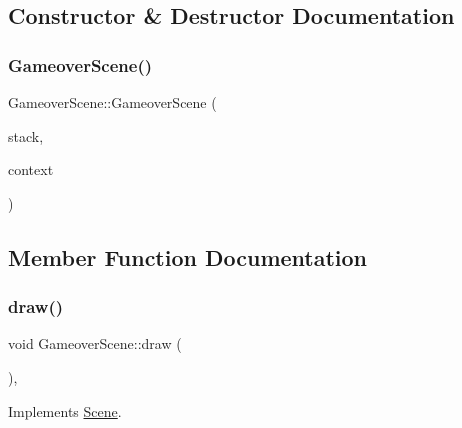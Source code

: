 \subsection{Constructor \& Destructor Documentation}
\mbox{\label{class_gameover_scene_a8d57771f3b59da589d2341d4d3b9d299}} 
\subsubsection{\texorpdfstring{Gameover\+Scene()}{GameoverScene()}}
{\footnotesize\ttfamily Gameover\+Scene\+::\+Gameover\+Scene (\begin{DoxyParamCaption}\item[{\hyperlink{class_scene_stack}{Scene\+Stack} \&}]{stack,  }\item[{\hyperlink{struct_scene_1_1_context}{Context}}]{context }\end{DoxyParamCaption})}



\subsection{Member Function Documentation}
\mbox{\label{class_gameover_scene_ae8a5e79e002d0e79edaec9ec1b0df902}} 
\subsubsection{\texorpdfstring{draw()}{draw()}}
{\footnotesize\ttfamily void Gameover\+Scene\+::draw (\begin{DoxyParamCaption}{ }\end{DoxyParamCaption})\hspace{0.3cm}{\ttfamily [override]}, {\ttfamily [virtual]}}



Implements \hyperlink{class_scene_a789c16961aa1e316b2a4a05b95187546}{Scene}.

\mbox{\label{class_gameover_scene_ac951bc51d29e2d14807e3da2e885ccc8}} 
